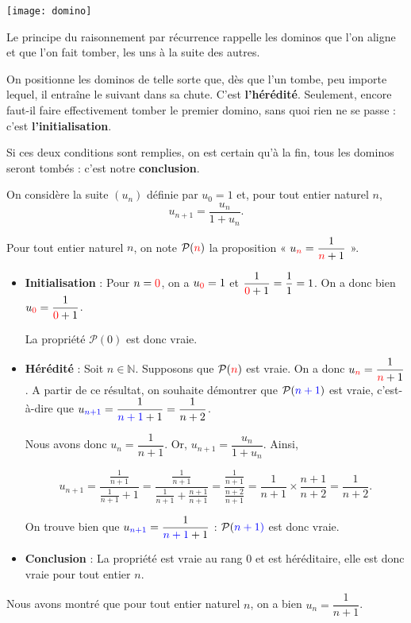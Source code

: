 \documentclass[11pt,fleqn]{book} %
\begin{document}
\begin{minipage}{0.15\linewidth}
\begin{center}
\texttt{[image: domino]}
\end{center}
\end{minipage}\hfill\begin{minipage}{0.78\linewidth}
Le principe du raisonnement par récurrence rappelle les dominos que l'on aligne et que l'on fait tomber, les uns à la suite des autres.

\vskip5pt
On positionne les dominos de telle sorte que, dès que l'un tombe, peu importe lequel, il entraîne le suivant dans sa chute. C'est \textbf{l'hérédité}. Seulement, encore faut-il faire effectivement tomber le premier domino, sans quoi rien ne se passe : c'est \textbf{l'initialisation}.

\vskip5pt
Si ces deux conditions sont remplies, on est certain qu'à la fin, tous les dominos seront tombés : c'est notre \textbf{conclusion}.\end{minipage}

\newpage
\begin{example}
On considère la suite \((u_n)\) définie par \(u_0=1\) et, pour tout entier naturel \(n\), \[u_{n+1}=\dfrac{u_n}{1+u_n}.\]

Pour tout entier naturel $n$, on note \(\mathcal{P}(\color{red}n\color{black})\) la proposition  « \(u_{\color{red}n}=\dfrac{1}{\color{red}n\color{black}+1}\) ».
\begin{itemize}
\item \textbf{Initialisation} : Pour \(n=\color{red}0\), on a $u_{\color{red}0\color{black}}=1$ et $\dfrac{1}{\color{red}0\color{black}+1}=\dfrac{1}{1}=1$. On a donc bien $u_{\color{red}0\color{black}}=\dfrac{1}{\color{red}0\color{black}+1}$. 

La propriété $\mathcal{P}(0)$ est donc vraie.
\item \textbf{Hérédité} : Soit \(n\in\mathbb{N}\). Supposons que \(\mathcal{P}(\color{red}n\color{black})\) est vraie. On a donc \(u_{\color{red}n} = \dfrac{1}{\color{red}n\color{black}+1}\). A partir de ce résultat, on souhaite démontrer que \(\mathcal{P}(\color{blue}{n+1}\color{black})\) est vraie, c'est-à-dire que \(u_{\color{blue}{n+1}}=\dfrac{1}{\color{blue}{n+1}\color{black}+1}=\dfrac{1}{n+2}\).

Nous avons donc \( u_n = \dfrac{1}{n+1}\). Or, \(u_{n+1} = \dfrac{u_n}{1+u_n}\). Ainsi,

\[ u_{n+1} = \dfrac{\frac{1}{n+1}}{\frac{1}{n+1}+1}=\dfrac{\frac{1}{n+1}}{\frac{1}{n+1}+\frac{n+1}{n+1}}=\dfrac{\frac{1}{n+1}}{\frac{n+2}{n+1}}=\dfrac{1}{n+1} \times \dfrac{n+1}{n+2}=\dfrac{1}{n+2}. \]

On trouve bien que \(u_{\color{blue}{n+1}}=\dfrac{1}{\color{blue}{n+1}\color{black}+1}\) : \( \mathcal{P}( \color{blue}{n+1})\) est donc vraie.
\item \textbf{Conclusion} : La propriété est vraie au rang 0 et est héréditaire, elle est donc vraie pour tout entier \(n\).\end{itemize}
Nous avons montré que pour tout entier naturel \(n\), on a bien \(u_n= \dfrac{1}{n+1}\).\end{example}
\end{document}

